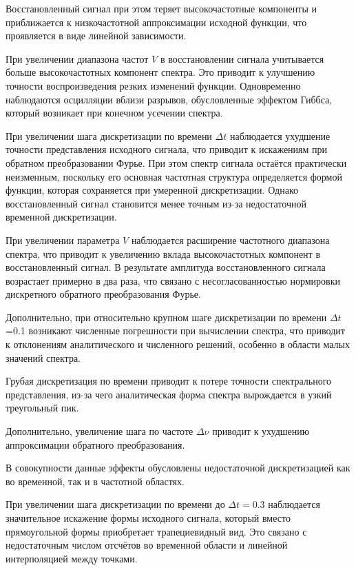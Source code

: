 \documentclass[a4paper, 12pt]{article}
\begin{document}
Восстановленный сигнал при этом теряет высокочастотные компоненты и приближается к низкочастотной аппроксимации исходной функции, что проявляется в виде линейной зависимости.

При увеличении диапазона частот $V$ в восстановлении сигнала учитывается больше высокочастотных компонент спектра. Это приводит к улучшению точности воспроизведения резких изменений функции. Одновременно наблюдаются осцилляции вблизи разрывов, обусловленные эффектом Гиббса, который возникает при конечном усечении спектра.
%

При увеличении шага дискретизации по времени $\Delta t$ наблюдается ухудшение точности представления исходного сигнала, что приводит к искажениям при обратном преобразовании Фурье. При этом спектр сигнала остаётся практически неизменным, поскольку его основная частотная структура определяется формой функции, которая сохраняется при умеренной дискретизации. Однако восстановленный сигнал становится менее точным из-за недостаточной временной дискретизации.

При увеличении параметра $V$ наблюдается расширение частотного диапазона спектра, что приводит к увеличению вклада высокочастотных компонент в восстановленный сигнал. В результате амплитуда восстановленного сигнала возрастает примерно в два раза, что связано с несогласованностью нормировки дискретного обратного преобразования Фурье.

Дополнительно, при относительно крупном шаге дискретизации по времени $\Delta t$=0.1 возникают численные погрешности при вычислении спектра, что приводит к отклонениям аналитического и численного решений, особенно в области малых значений спектра.
 
Грубая дискретизация по времени приводит к потере точности спектрального представления, из-за чего аналитическая форма спектра вырождается в узкий треугольный пик.

Дополнительно, увеличение шага по частоте $\Delta \nu$ приводит к ухудшению аппроксимации обратного преобразования.

В совокупности данные эффекты обусловлены недостаточной дискретизацией как во временной, так и в частотной областях.

При увеличении шага дискретизации по времени до $\Delta t = 0.3$ наблюдается значительное искажение формы исходного сигнала, который вместо прямоугольной формы приобретает трапециевидный вид. Это связано с недостаточным числом отсчётов во временной области и линейной интерполяцией между точками.
\end{document}
